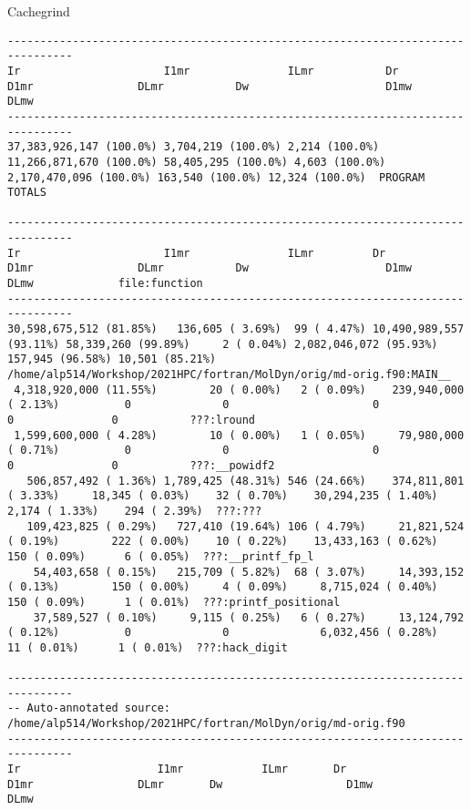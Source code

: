 \documentclass[10pt,t]{beamer}
\begin{document}
\begin{frame}{Cachegrind}
\begin{itemize}
\begin{lstlisting}[basicstyle=\fontsize{4.5}{5.5}\selectfont\ttfamily]
--------------------------------------------------------------------------------
Ir                      I1mr               ILmr           Dr                      D1mr                DLmr           Dw                     D1mw             DLmw
--------------------------------------------------------------------------------
37,383,926,147 (100.0%) 3,704,219 (100.0%) 2,214 (100.0%) 11,266,871,670 (100.0%) 58,405,295 (100.0%) 4,603 (100.0%) 2,170,470,096 (100.0%) 163,540 (100.0%) 12,324 (100.0%)  PROGRAM TOTALS

--------------------------------------------------------------------------------
Ir                      I1mr               ILmr         Dr                      D1mr                DLmr           Dw                     D1mw             DLmw             file:function
--------------------------------------------------------------------------------
30,598,675,512 (81.85%)   136,605 ( 3.69%)  99 ( 4.47%) 10,490,989,557 (93.11%) 58,339,260 (99.89%)     2 ( 0.04%) 2,082,046,072 (95.93%) 157,945 (96.58%) 10,501 (85.21%)  /home/alp514/Workshop/2021HPC/fortran/MolDyn/orig/md-orig.f90:MAIN__
 4,318,920,000 (11.55%)        20 ( 0.00%)   2 ( 0.09%)    239,940,000 ( 2.13%)          0              0                      0                0               0           ???:lround
 1,599,600,000 ( 4.28%)        10 ( 0.00%)   1 ( 0.05%)     79,980,000 ( 0.71%)          0              0                      0                0               0           ???:__powidf2
   506,857,492 ( 1.36%) 1,789,425 (48.31%) 546 (24.66%)    374,811,801 ( 3.33%)     18,345 ( 0.03%)    32 ( 0.70%)    30,294,235 ( 1.40%)   2,174 ( 1.33%)    294 ( 2.39%)  ???:???
   109,423,825 ( 0.29%)   727,410 (19.64%) 106 ( 4.79%)     21,821,524 ( 0.19%)        222 ( 0.00%)    10 ( 0.22%)    13,433,163 ( 0.62%)     150 ( 0.09%)      6 ( 0.05%)  ???:__printf_fp_l
    54,403,658 ( 0.15%)   215,709 ( 5.82%)  68 ( 3.07%)     14,393,152 ( 0.13%)        150 ( 0.00%)     4 ( 0.09%)     8,715,024 ( 0.40%)     150 ( 0.09%)      1 ( 0.01%)  ???:printf_positional
    37,589,527 ( 0.10%)     9,115 ( 0.25%)   6 ( 0.27%)     13,124,792 ( 0.12%)          0              0              6,032,456 ( 0.28%)      11 ( 0.01%)      1 ( 0.01%)  ???:hack_digit

--------------------------------------------------------------------------------
-- Auto-annotated source: /home/alp514/Workshop/2021HPC/fortran/MolDyn/orig/md-orig.f90
--------------------------------------------------------------------------------
Ir                     I1mr            ILmr       Dr                     D1mr                DLmr       Dw                   D1mw            DLmw


\end{lstlisting}
\end{itemize}
\end{frame}
\end{document}
